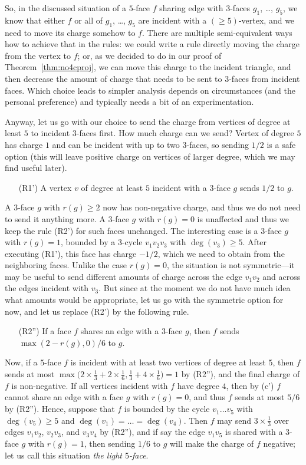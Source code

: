 \documentclass[12pt,twoside,openright,a4paper]{book}
\begin{document}
So, in the discussed situation of a $5$-face $f$ sharing edge with $3$-faces $g_1$, \ldots, $g_5$, we know that either $f$
or all of $g_1$, \ldots, $g_5$ are incident with a $(\ge\!5)$-vertex, and we need to move its charge somehow to $f$.
There are multiple semi-equivalent ways how to achieve that in the rules: we could write a rule directly moving the charge from
the vertex to $f$; or, as we decided to do in our proof of Theorem~\ref{thm:no4cproj}, we can move this charge to the incident
triangle, and then decrease the amount of charge that needs to be sent to $3$-faces from incident faces. Which choice leads to
simpler analysis depends on circumstances (and the personal preference) and typically needs a bit of an experimentation.

Anyway, let us go with our choice to send the charge from vertices of degree at least $5$ to incident $3$-faces first.
How much charge can we send? Vertex of degree $5$ has charge $1$ and can be incident with up to two $3$-faces,
so sending $1/2$ is a safe option (this will leave positive charge on vertices of larger degree, which we may find
useful later).
\begin{itemize}
\item[(R1')] A vertex $v$ of degree at least $5$ incident with a $3$-face $g$ sends $1/2$ to $g$.
\end{itemize}
A $3$-face $g$ with $r(g)\ge 2$ now has non-negative charge, and thus we do not need to send it anything more.
A $3$-face $g$ with $r(g)=0$ is unaffected and thus we keep the rule (R2') for such faces unchanged.
The interesting case is a $3$-face $g$ with $r(g)=1$, bounded by a $3$-cycle $v_1v_2v_3$ with $\deg(v_3)\ge 5$.
After executing (R1'), this face has charge $-1/2$, which we need to obtain from the neighboring faces.
Unlike the case $r(g)=0$, the situation is not symmetric---it may be useful to send different amounts of charge
across the edge $v_1v_2$ and across the edges incident with $v_3$.  But since at the moment we do not have
much idea what amounts would be appropriate, let us go with the symmetric option for now, and let us
replace (R2') by the following rule.
\begin{itemize}
\item[(R2'')] If a face $f$ shares an edge with a $3$-face $g$, then $f$ sends $\max(2-r(g),0)/6$ to $g$.
\end{itemize}
Now, if a $5$-face $f$ is incident with at least two vertices of degree at least $5$, then $f$ sends
at most $\max\bigl(2\times \frac{1}{3}+2\times\frac{1}{6},\frac{1}{3}+4\times\frac{1}{6}\bigr)=1$
by (R2''), and the final charge of $f$ is non-negative.  If all vertices incident with $f$ have degree $4$,
then by (c') $f$ cannot share an edge with a face $g$ with $r(g)=0$, and thus $f$ sends at most $5/6$ by (R2'').
Hence, suppose that $f$ is bounded by the cycle $v_1\ldots v_5$ with $\deg(v_5)\ge 5$ and $\deg(v_1)=\ldots=\deg(v_4)$.
Then $f$ may send $3\times \frac{1}{3}$ over edges $v_1v_2$, $v_2v_3$, and $v_3v_4$ by (R2''), and if
say the edge $v_1v_5$ is shared with a $3$-face $g$ with $r(g)=1$, then sending $1/6$ to $g$ will make the charge
of $f$ negative; let us call this situation \emph{the light $5$-face}.
\end{document}
